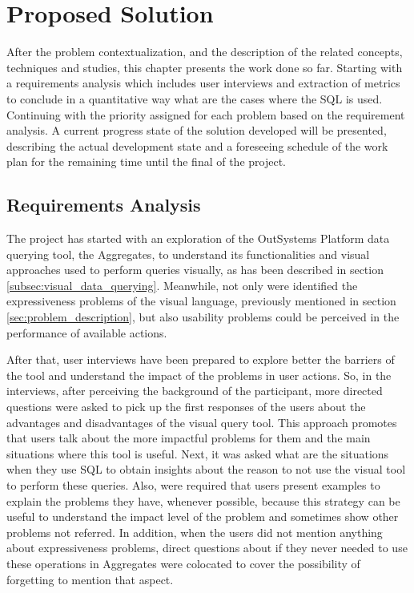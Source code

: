 \chapter{Proposed Solution}
\label{cha:proposed_solution}
After the problem contextualization, and the description of the related concepts, techniques and studies, this chapter presents the work done so far. Starting with a requirements analysis which includes user interviews and extraction of metrics to conclude in a quantitative way what are the cases where the SQL is used. Continuing with the priority assigned for each problem based on the requirement analysis. A current progress state of the solution developed will be presented, describing the actual development state and a foreseeing schedule of the work plan for the remaining time until the final of the project.

\section{Requirements Analysis}
\label{sec:requirements_analysis}
The project has started with an exploration of the OutSystems Platform data querying tool, the Aggregates, to understand its functionalities and visual approaches used to perform queries visually, as has been described in section \ref{subsec:visual_data_querying}. Meanwhile, not only were identified the expressiveness problems of the visual language, previously mentioned in section \ref{sec:problem_description}, but also usability problems could be perceived in the performance of available actions. 

After that, user interviews have been prepared to explore better the barriers of the tool and understand the impact of the problems in user actions. So, in the interviews, after perceiving the background of the participant, more directed questions were asked to pick up the first responses of the users about the advantages and disadvantages of the visual query tool. This approach promotes that users talk about the more impactful problems for them and the main situations where this tool is useful. Next, it was asked what are the situations when they use SQL to obtain insights about the reason to not use the visual tool to perform these queries. Also, were required that users present examples to explain the problems they have, whenever possible, because this strategy can be useful to understand the impact level of the problem and sometimes show other problems not referred. In addition, when the users did not mention anything about expressiveness problems, direct questions about if they never needed to use these operations in Aggregates were colocated to cover the possibility of forgetting to mention that aspect.

